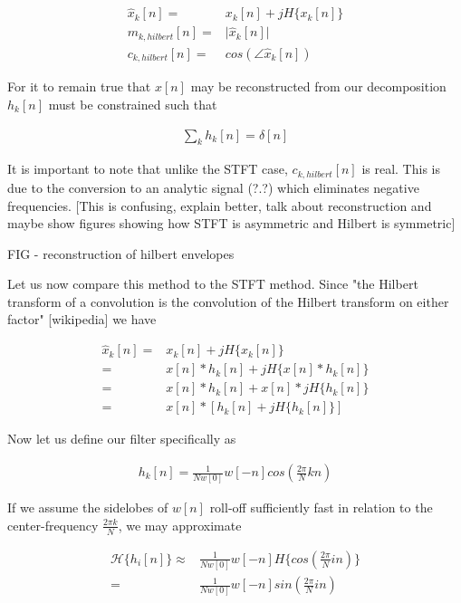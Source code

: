\documentclass [11pt, proquest] {uwthesis}[2015/03/03]
\begin{document}
\begin{align}
\widehat{x}_k[n] =& x_k[n] + jH\{x_k[n]\} \\
\label{eq:hilbert_envelope}
m_{k,hilbert}[n] =& \vert\widehat{x}_k[n]\vert \\
c_{k,hilbert}[n] =& cos(\angle\widehat{x}_k[n])
\end{align}

For it to remain true that $x[n]$ may be reconstructed from our decomposition $h_k[n]$ must be constrained such that 

\begin{align}
\sum_k h_k[n] = \delta[n]
\end{align}

It is important to note that unlike the STFT case, $c_{k,hilbert}[n]$ is real.  This is due to the conversion to an analytic signal (?.?) which eliminates negative frequencies.  [This is confusing, explain better, talk about reconstruction and maybe show figures showing how STFT is asymmetric and Hilbert is symmetric]

FIG - reconstruction of hilbert envelopes

Let us now compare this method to the STFT method.  Since "the Hilbert transform of a convolution is the convolution of the Hilbert transform on either factor" [wikipedia] we have 

\begin{align}
\label{eq:x_analytic}
\widehat{x}_k[n] =& x_k[n] + jH\{x_k[n]\} \nonumber \\
=& x[n] * h_k[n] + jH\{x[n] * h_k[n]\} \nonumber \\
=& x[n] * h_k[n] + x[n] * jH\{h_k[n]\} \nonumber \\
=& x[n] * [h_k[n]+  jH\{h_k[n]\}]
\end{align}

Now let us define our filter specifically as

\begin{align}
\label{eq:hilbert_constrained_filter}
h_k[n] = \frac{1}{Nw[0]}w[-n]cos(\frac{2\pi}{N}kn)
\end{align}

If we assume the sidelobes of $w[n]$ roll-off sufficiently fast in relation to the center-frequency $\frac{2\pi k}{N}$, we may approximate

\begin{align}
\mathcal{H}\{h_i[n]\} \approx& \frac{1}{Nw[0]}w[-n] H\{cos(\frac{2\pi}{N}in)\} \nonumber \\
=& \frac{1}{Nw[0]}w[-n]sin(\frac{2\pi}{N}in)
\end{align}
\end{document}
